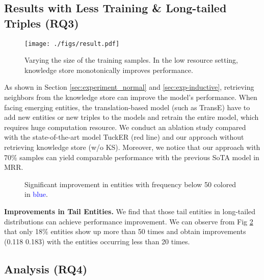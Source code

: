 \documentclass[runningheads]{llncs}
\begin{document}
\subsection{Results with  Less Training \& Long-tailed Triples (RQ3)}
\label{sec:ana-long-tail}

\begin{figure}[!htb] \centering \texttt{[image: ./figs/result.pdf]} \caption{Varying the size of the training samples. In the low resource setting, knowledge store monotonically improves performance.} 
\label{fig:incremental}
\end{figure} As shown in Section \ref{sec:experiment_normal} and \ref{sec:exp-inductive}, retrieving neighbors from the knowledge store can improve the model's performance.
When facing emerging entities, the translation-based model (such as TransE) have to add new entities or new triples to the models and retrain the entire model, which requires huge computation resource.  
We conduct an ablation study compared with the state-of-the-art model TuckER \cite{tucker} (red line) and our approach without retrieving knowledge store (w/o KS). 
Moreover, we notice that our approach with 70\% samples can yield comparable performance with the previous SoTA model in MRR.

\begin{figure}[htbp]
	\label{PAAbefore}
	\centering
		\caption{Significant improvement in entities with frequency below 50 colored in \textcolor{blue}{blue}.}
		\label{fig:long-tailed}
\end{figure}
 


\textbf{Improvements in Tail Entities.}
We find that those tail entities in long-tailed distributions can achieve performance improvement. 
We can observe from Fig \ref{fig:long-tailed} that only 18\% entities show up more than 50 times and {\ours} obtain improvements (0.118  0.183) with the entities occurring less than 20 times.




\subsection{Analysis (RQ4)}
\label{sec:analysis}
\end{document}
